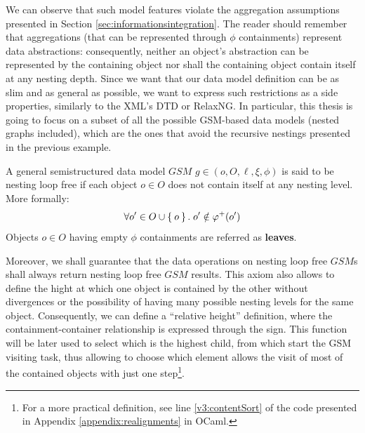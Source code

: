 We can observe that such model features violate the aggregation assumptions presented in Section \vref{sec:informationsintegration}. The reader should remember that aggregations (that can be represented through $\phi$ containments) represent data abstractions:  consequently, neither an object's abstraction can be represented by  the containing object  nor shall the containing object  contain itself at any nesting depth. Since we want that our data model definition can be as slim and as general as possible, we want to express such restrictions as a side properties, similarly to the XML's DTD or RelaxNG. In particular, this thesis is going to focus on a subset of all the possible GSM-based data models (nested graphs included), which are the ones that avoid the recursive nestings presented in the previous example.

\begin{axiom}
A general semistructured data model $GSM$ $g\in(o,O,\ell,\xi,\phi)$ is said to be nesting loop free if each object $o\in O$ does not contain itself at any nesting level. More formally:
\[\forall o'\in O\cup\Set{o}.\; o'\notin \varphi^+(o')\]
Objects $o\in O$ having empty $\phi$ containments are referred as \textbf{leaves}.
\end{axiom}

Moreover, we shall guarantee that the data operations on nesting loop free $GSM$s shall always return nesting loop free $GSM$ results. This axiom also allows to define the hight at which one object is contained by the other without divergences or the possibility of having many possible nesting levels for the same object. Consequently, we can define a ``relative height'' definition, where the containment-container relationship is expressed through the sign. This function will be later used to select which is the highest child, from which start the GSM visiting task, thus allowing to choose which element allows the visit of most of the contained objects with just one step\footnote{For a more practical definition, see line \ref{v3:contentSort} of the code presented in Appendix \vref{appendix:realignments} in OCaml.}. 

